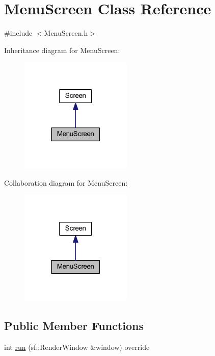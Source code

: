 \hypertarget{class_menu_screen}{}\section{Menu\+Screen Class Reference}
\label{class_menu_screen}


{\ttfamily \#include $<$Menu\+Screen.\+h$>$}



Inheritance diagram for Menu\+Screen\+:
\nopagebreak
\begin{figure}[H]
\begin{center}
\leavevmode
\includegraphics[width=151pt]{class_menu_screen__inherit__graph}
\end{center}
\end{figure}


Collaboration diagram for Menu\+Screen\+:
\nopagebreak
\begin{figure}[H]
\begin{center}
\leavevmode
\includegraphics[width=151pt]{class_menu_screen__coll__graph}
\end{center}
\end{figure}
\subsection*{Public Member Functions}
\begin{DoxyCompactItemize}
\item 
int \hyperlink{class_menu_screen_ad6e00debf1d2ddcaa716327598590cf5}{run} (sf\+::\+Render\+Window \&window) override
\end{DoxyCompactItemize}


